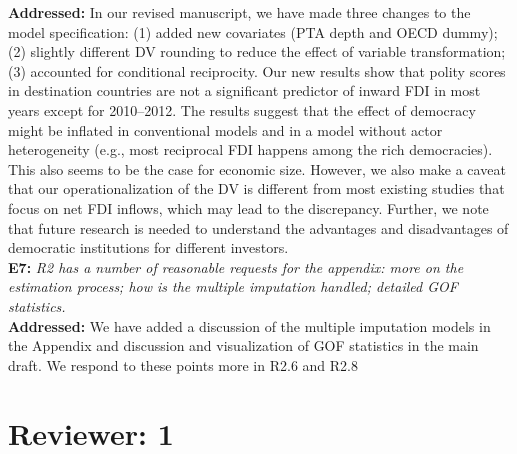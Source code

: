 \documentclass[a4paper,11pt]{texMemo}
\begin{document}
\noindent \textbf{Addressed:} In our revised manuscript, we have made three changes to the model specification: (1) added new covariates (PTA depth and OECD dummy); (2) slightly different DV rounding to reduce the effect of variable transformation; (3) accounted for conditional reciprocity. Our new results show that polity scores in destination countries are not a significant predictor of inward FDI in most years except for 2010--2012. The results suggest that the effect of democracy might be inflated in conventional models and in a model without actor heterogeneity (e.g., most reciprocal FDI happens among the rich democracies). This also seems to be the case for economic size. However, we also make a caveat that our operationalization of the DV is different from most existing studies that focus on net FDI inflows, which may lead to the discrepancy. Further, we note that future research is needed to understand the advantages and disadvantages of democratic institutions for different investors.\\

\noindent \textbf{E7:} \emph{R2 has a number of reasonable requests for the appendix: more on the estimation process; how is the multiple imputation handled; detailed GOF statistics.}\\

\noindent \textbf{Addressed:} We have added a discussion of the multiple imputation models in the Appendix and discussion and visualization of GOF statistics in the main draft. We respond to these points more in R2.6 and R2.8\\


\section*{Reviewer: 1}
\end{document}
